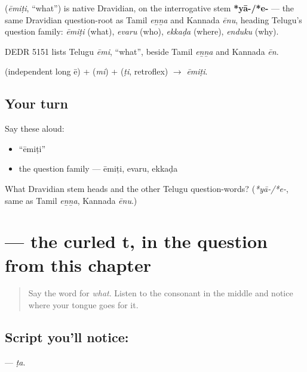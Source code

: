 \begin{cousinweb}
\textbf{} (\emph{ēmiṭi}, \textquotedblleft{}what\textquotedblright{}) is native Dravidian, on the interrogative stem \textbf{*yā-/*e-} — the same Dravidian question-root as Tamil \emph{eṉṉa} and Kannada \emph{ēnu}, heading Telugu's question family: \emph{ēmiṭi} (what), \emph{evaru} (who), \emph{ekkaḍa} (where), \emph{enduku} (why).

DEDR 5151 lists Telugu \emph{ēmi}, \textquotedblleft{}what\textquotedblright{}, beside Tamil \emph{eṉṉa} and Kannada \emph{ēn}.
\end{cousinweb}

\begin{sounds}
 (independent long ē) +  (\emph{mi}) +  (\emph{ṭi}, retroflex) $\to$ \emph{ēmiṭi}.
\end{sounds}

\subsection*{Your turn}
Say these aloud:

\begin{itemize}
\raggedright
  \item \textquotedblleft{}ēmiṭi\textquotedblright{}
  \item the question family — ēmiṭi, evaru, ekkaḍa
\end{itemize}

\begin{tcolorbox}[breakable,colback=teal!4,colframe=teal!35!black,title={Before you move on}]
What Dravidian stem heads \textbf{} and the other Telugu question-words? (\emph{*yā-/*e-}, same as Tamil \emph{eṉṉa}, Kannada \emph{ēnu}.)
\end{tcolorbox}
\section[\texorpdfstring{\te{ట} (ṭa)}{ట (ṭa)}]{ — the curled t, in the question from this chapter}

\label{lesson:TE-S152-letter-tta}



\begin{quote}
Say the word for \emph{what}. Listen to the consonant in the middle and notice where your tongue goes for it.
\end{quote}

\subsection*{Script you'll notice: }
\textbf{} — \emph{ṭa}.

